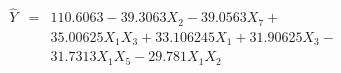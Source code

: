 \documentclass[12pt]{article}
\begin{document}
\pagestyle{empty}
\Large
{}
\pagecolor{ehandbook}


\boldmath
\begin{eqnarray*}
\hat{Y} & = & 110.6063 - 39.3063 X_2 - 39.0563 X_7 + \\
           &    & 35.00625 X_1 X_3 + 33.106245 X_1 + 31.90625 X_3 - \\
           &    & 31.7313 X_1 X_5 - 29.781 X_1 X_2
\end{eqnarray*}
\end{document}
